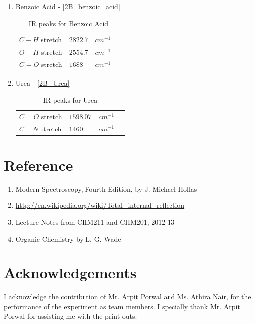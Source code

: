 \begin{enumerate}
		\item Benzoic Acid - \autoref{2B_benzoic_acid}
			\begin{table}
				\myfloatalign
				\begin{tabularx}{\textwidth}{Xlll}
					\hline%
					$C-H$ stretch	& 	$2822.7$	& 	$cm^{-1}$\\
					$O-H$ stretch	& 	$2554.7$	& 	$cm^{-1}$\\
					$C=O$ stretch	& 	$1688$	& 	$cm^{-1}$\\
					\hline%
				\end{tabularx}
				\caption{IR peaks for Benzoic Acid}
				\label{2B_benzoic_acid}
			\end{table}

		\item Urea - \autoref{2B_Urea}
			\begin{table}
				\myfloatalign
				\begin{tabularx}{\textwidth}{Xlll}
					\hline%
					$C=O$ stretch	& 	$1598.07$	& 	$cm^{-1}$\\
					$C-N$ stretch	& 	$1460$	& 	$cm^{-1}$\\					
					\hline%
				\end{tabularx}
				\caption{IR peaks for Urea}
				\label{2B_Urea}
			\end{table}

	\end{enumerate}


\section{Reference}
	\begin{enumerate}
		\item Modern Spectroscopy, Fourth Edition, by J. Michael Hollas
		\item \url{http://en.wikipedia.org/wiki/Total_internal_reflection}
		\item Lecture Notes from CHM211 and CHM201, 2012-13
		\item Organic Chemistry by L. G. Wade
	\end{enumerate}

\section{Acknowledgements}
	I acknowledge the contribution of Mr. Arpit Porwal and Ms. Athira Nair, for the performance of the experiment as team members. I specially thank Mr. Arpit Porwal for assisting me with the print outs.\\